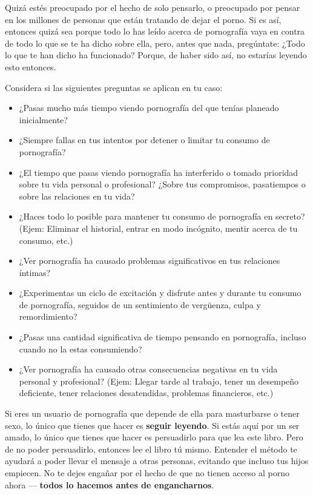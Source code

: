 \documentclass[
  spanish,
  openany]{book}
\providecommand{\tightlist}{%
  \setlength{\itemsep}{0pt}\setlength{\parskip}{0pt}}
\begin{document}
Quizá estés preocupado por el hecho de solo pensarlo, o preocupado por pensar en los millones de personas que están tratando de dejar el porno. Si es así, entonces quizá sea porque todo lo has leído acerca de pornografía vaya en contra de todo lo que se te ha dicho sobre ella, pero, antes que nada, pregúntate: ¿Todo lo que te han dicho ha funcionado? Porque, de haber sido así, no estarías leyendo esto entonces.

Considera si las siguientes preguntas se aplican en tu caso:

\begin{itemize}
\tightlist
\item
  ¿Pasas mucho más tiempo viendo pornografía del que tenías planeado inicialmente?
\item
  ¿Siempre fallas en tus intentos por detener o limitar tu consumo de pornografía?
\item
  ¿El tiempo que pasas viendo pornografía ha interferido o tomado prioridad sobre tu vida personal o profesional? ¿Sobre tus compromisos, pasatiempos o sobre las relaciones en tu vida?
\item
  ¿Haces todo lo posible para mantener tu consumo de pornografía en secreto? (Ejem: Eliminar el historial, entrar en modo incógnito, mentir acerca de tu consumo, etc.)
\item
  ¿Ver pornografía ha causado problemas significativos en tus relaciones íntimas?
\item
  ¿Experimentas un ciclo de excitación y disfrute antes y durante tu consumo de pornografía, seguidos de un sentimiento de vergüenza, culpa y remordimiento?
\item
  ¿Pasas una cantidad significativa de tiempo pensando en pornografía, incluso cuando no la estas consumiendo?
\item
  ¿Ver pornografía ha causado otras consecuencias negativas en tu vida personal y profesional? (Ejem: Llegar tarde al trabajo, tener un desempeño deficiente, tener relaciones desatendidas, problemas financieros, etc.)
\end{itemize}

Si eres un usuario de pornografía que depende de ella para masturbarse o tener sexo, lo único que tienes que hacer es \textbf{seguir leyendo}. Si estás aquí por un ser amado, lo único que tienes que hacer es persuadirlo para que lea este libro. Pero de no poder persuadirlo, entonces lee el libro tú mismo. Entender el método te ayudará a poder llevar el mensaje a otras personas, evitando que incluso tus hijos empiecen. No te dejes engañar por el hecho de que no tienen acceso al porno ahora --- \textbf{todos lo hacemos antes de engancharnos}.
\end{document}
